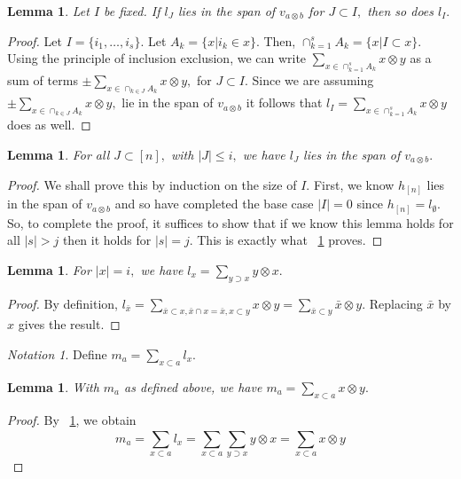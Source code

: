 \documentclass{amsart}
\newtheorem{lem}[thm]{Lemma}
\theoremstyle{remark}
\newtheorem{note}[thm]{Notation}
\begin{document}
\begin{lem}
\label{l_induction_step}
Let $I$ be fixed. If $l_J$ lies in the span of $v_{a\otimes b}$ for $J \subset I,$ then so does $l_I.$

\end{lem}
\begin{proof}
Let $I = \{i_1,\ldots, i_s\}.$ Let $A_k = \{x | i_k \in x\}.$ Then, $\cap_{k=1}^s A_k = \{x | I \subset x\}.$ Using the principle of inclusion exclusion, we can write $\sum_{x \in\cap_{k=1}^s A_k} x\otimes y$ as a sum of terms $\pm \sum_{x \in\cap_{k \in J} A_k} x\otimes y,$ for $J \subset I.$ Since we are assuming $\pm \sum_{x \in\cap_{k \in J} A_k} x\otimes y,$ lie in the span of $v_{a\otimes b}$ it follows that $l_I = \sum_{x \in\cap_{k=1}^s A_k} x\otimes y$ does as well.

\end{proof}

\begin{lem}
For all $J \subset [n],$ with $|J| \leq i,$ we have $l_{J}$ lies in the span of $v_{a \otimes b}.$ 
\end{lem}
\begin{proof}
We shall prove this by induction on the size of $I.$ First, we know $h_{[n]}$ lies in the span of $v_{a\otimes b}$ and so have completed the base case $|I| = 0$ since $h_{[n]} = l_{\emptyset}.$ So, to complete the proof, it suffices to show that if we know this lemma holds for all $|s|>j$ then it holds for $|s| = j.$  This is exactly what ~\ref{l_induction_step} proves.
\end{proof}

\begin{lem}
\label{l_diag_equivalence}
For $|x| = i,$ we have $l_{x} = \sum_{y \supset x}^{}y\otimes x.$
\end{lem}
\begin{proof}
By definition, $l_{\bar x} = \sum_{\bar x\subset x,\bar x \cap x = \bar x,x\subset y}^{}x\otimes y = \sum_{\bar x\subset y}^{}\bar x\otimes y.$ Replacing $\bar x$ by $x$ gives the result.
\end{proof}

\begin{note}
Define $m_a = \sum_{x \subset a}^{}l_{x}.$
\end{note}

\begin{lem}
\label{m_equivalence}
With $m_a$ as defined above, we have $m_a = \sum_{x\subset a}^{}x\otimes y.$
\end{lem}
\begin{proof}
By ~\ref{l_diag_equivalence}, we obtain
$$m_a = \sum_{x \subset a}^{}l_{x} = \sum_{x \subset a}^{}\sum_{y \supset x}^{}y\otimes x= \sum_{x\subset a}^{}x\otimes y$$
\end{proof}
\end{document}
